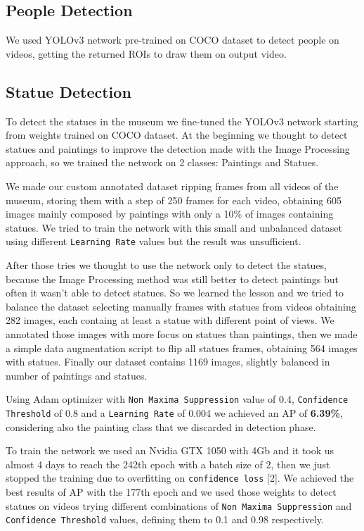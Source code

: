 \documentclass[10pt,twocolumn,letterpaper]{article}
\begin{document}
\subsection{People Detection}

We used YOLOv3 network pre-trained on COCO dataset to detect people on videos, getting the returned
ROIs to draw them on output video.

\subsection{Statue Detection}

To detect the statues in the museum we fine-tuned the YOLOv3 network starting from
weights trained on COCO dataset. At the beginning we thought to detect statues and paintings
to improve the detection made with the Image Processing approach, so we trained the network
on 2 classes: Paintings and Statues.

We made our custom annotated dataset ripping frames from all videos of the museum, storing
them with a step of 250 frames for each video, obtaining 605 images mainly composed by paintings 
with only a 10\% of images containing statues.
We tried to train the network with this small and unbalanced dataset using different {\tt Learning Rate} 
values but the result was unsufficient.

After those tries we thought to use the network only to detect the statues, because the Image Processing
method was still better to detect paintings but often it wasn't able to detect statues.
So we learned the lesson and we tried to balance the dataset selecting manually frames with statues
from videos obtaining 282 images, each containg at least a statue with different point of views.
We annotated those images with more focus on statues than paintings, then we made a simple data 
augmentation script to flip all statues frames, obtaining 564 images with statues.
Finally our dataset contains 1169 images, slightly balanced in number of paintings and statues.

Using Adam optimizer with {\tt Non Maxima Suppression} value of 0.4, {\tt Confidence Threshold} of 0.8 
and a {\tt Learning Rate} of 0.004 we achieved an AP of {\bf 6.39\%}, considering also the painting class that we 
discarded in detection phase. 

To train the network we used an Nvidia GTX 1050 with 4Gb and it took us almost 4 days to
reach the 242th epoch with a batch size of 2, then we just stopped the training due to overfitting on 
{\tt confidence loss} [2]. 
We achieved the best results of AP with the 177th epoch and we used those weights to detect
statues on videos trying different combinations of {\tt Non Maxima Suppression} and {\tt Confidence Threshold} values,
defining them to 0.1 and 0.98 respectively.
\end{document}
